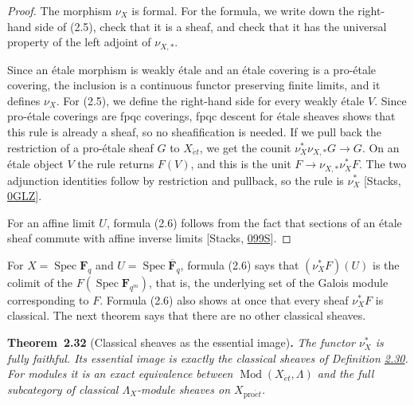 \documentclass[11pt]{article}
\newenvironment{bpstatement}[2]{\par\addvspace{0.6\baselineskip}\noindent\textbf{#1}#2\textbf{.}\enspace\ignorespaces}
  {\par\addvspace{0.4\baselineskip}}
\newenvironment{bpstatementit}[2]{\begin{bpstatement}{#1}{#2}\itshape\ignorespaces}{\end{bpstatement}}
\begin{document}
\begin{proof}[{Proof}]\label{bp91}%
The morphism \(\nu_X\) is formal. For the formula, we write down the right-hand side of (2.5), check that it is a sheaf, and check that it has the universal property of the left adjoint of \(\nu_{X,*}\).

Since an étale morphism is weakly étale and an étale covering is a pro-étale covering, the inclusion is a continuous functor preserving finite limits, and it defines \(\nu_X\). For (2.5), we define the right-hand side for every weakly étale \(V\). Since pro-étale coverings are fpqc coverings, fpqc descent for étale sheaves shows that this rule is already a sheaf, so no sheafification is needed. If we pull back the restriction of a pro-étale sheaf \(G\) to \(X_{\acute{e}t}\), we get the counit \(\nu_X^*\nu_{X,*}G\to G\). On an étale object \(V\) the rule returns \(F(V)\), and this is the unit \(F\to\nu_{X,*}\nu_X^*F\). The two adjunction identities follow by restriction and pullback, so the rule is \(\nu_X^*\) [Stacks, \href{https://stacks.math.columbia.edu/tag/0GLZ}{0GLZ}].

For an affine limit \(U\), formula (2.6) follows from the fact that sections of an étale sheaf commute with affine inverse limits [Stacks, \href{https://stacks.math.columbia.edu/tag/099S}{099S}].
\end{proof}

\label{bp92}%
For \(X=\operatorname{Spec}\mathbf F_q\) and \(U=\operatorname{Spec}\overline{\mathbf F}_q\), formula (2.6) says that \((\nu_X^*F)(U)\) is the colimit of the \(F(\operatorname{Spec}\mathbf F_{q^m})\), that is, the underlying set of the Galois module corresponding to \(F\). Formula (2.6) also shows at once that every sheaf \(\nu_X^*F\) is classical. The next theorem says that there are no other classical sheaves.

\label{bp93}%
\begin{bpstatementit}{Theorem~2.32}{ (Classical sheaves as the essential image)}
The functor \(\nu_X^*\) is fully faithful. Its essential image is exactly the classical sheaves of Definition \hyperref[bp89]{2.30}. For modules it is an exact equivalence between \(\operatorname{Mod}(X_{\acute{e}t},\Lambda)\) and the full subcategory of classical \(\Lambda_X\)-module sheaves on \(X_{\mathrm{pro}\acute{e}t}\).
\end{bpstatementit}
\end{document}
